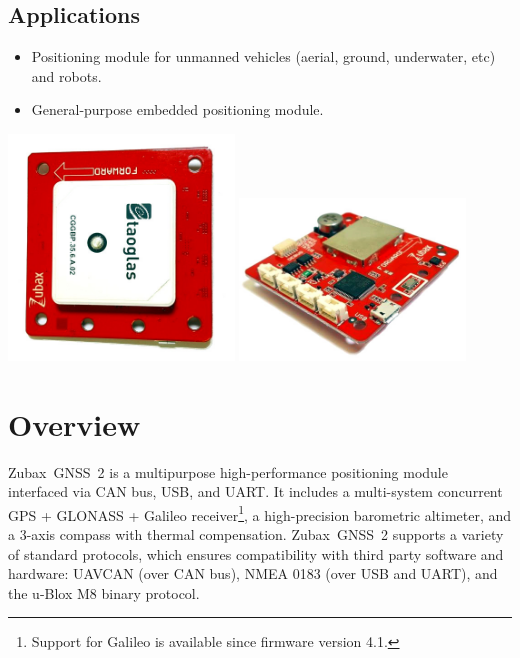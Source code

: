 \documentclass{zubaxdoc}
\begin{document}
\begin{titlepage}
\BeginRightColumn

\section*{Applications}

\begin{itemize}
	\item Positioning module for unmanned vehicles (aerial, ground, underwater, etc) and robots.
    \item General-purpose embedded positioning module.
\end{itemize}

\centering
\includegraphics[width=0.45\textwidth]{GNSS_top}
\includegraphics[width=0.45\textwidth]{GNSS_bottom}
\end{titlepage}

\tableofcontents
\listoffigures
\listoftables

\mainmatter

\chapter{Overview}

Zubax~GNSS~2 is a multipurpose high-performance positioning module interfaced via CAN bus, USB, and UART.
It includes a multi-system concurrent GPS + GLONASS + Galileo
receiver\footnote{Support for Galileo is available since firmware version 4.1.},
a high-precision barometric altimeter, and a 3-axis compass with thermal compensation.
Zubax~GNSS~2 supports a variety of standard protocols,
which ensures compatibility with third party software and hardware:
UAVCAN (over CAN bus), NMEA 0183 (over USB and UART), and the u-Blox M8 binary protocol.
\end{document}
